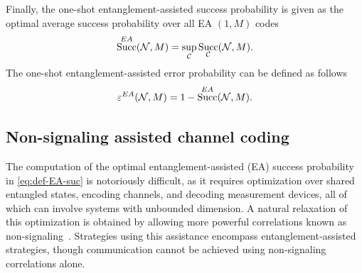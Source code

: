 \documentclass[a4paper,onecolumn,11pt,accepted=2025-10-01]{quantumarticle}
\DeclareMathOperator{\suc}{Succ}
\newcommand*{\cC}{\mathcal{C}}
\newcommand*{\cN}{\mathcal{N}}
\newcommand*{\eps}{\varepsilon}
\begin{document}
Finally, the  one-shot entanglement-assisted success  probability is  given as the optimal average success probability over all EA $(1,M)$ codes
\begin{equation}\label{eq:def-EA-suc}
    \suc^{\rm{EA}}(\cN, M) = \sup_{\cC}    \suc_{\cC}(\cN, M). 
\end{equation}
The one-shot entanglement-assisted error probability can be defined as follows
\begin{equation}\label{eq:def-EA-err}
    \eps^{\rm{EA}}(\cN, M) = 1-\suc^{\rm{EA}}(\cN, M).
\end{equation}


\subsection{Non-signaling assisted channel coding}\label{sec:NS-coding}

The computation of the optimal entanglement-assisted (EA) success probability in \eqref{eq:def-EA-suc} is notoriously difficult, as it requires optimization over  shared entangled states, encoding channels, and decoding measurement devices, all of which can involve systems with unbounded dimension. A natural relaxation of this optimization is obtained by allowing more powerful correlations known as non-signaling~\cite{Matthews2014Sep}. Strategies using this assistance encompass entanglement-assisted strategies, though communication cannot be achieved using non-signaling correlations alone.
\end{document}
